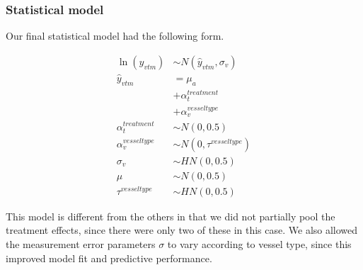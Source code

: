 \documentclass[
  letterpaper,
  DIV=11,
  numbers=noendperiod,
  oneside]{scrartcl}
\theoremstyle{plain}
\theoremstyle{remark}
\begin{document}
\begin{figure}


\caption{\label{fig-hypertension-data}}

\end{figure}%

\subsubsection{Statistical model}\label{statistical-model}

Our final statistical model had the following form.

\begin{align}
\ln(y_{vtm}) &\sim N(\hat{y}_{vtm}, \sigma_v) \label{eq-hypertension-model} \\
\hat{y}_{vtm} &= \mu_a \nonumber \\
  &+ \alpha^{treatment}_{t} \nonumber \\
  &+ \alpha^{vesseltype}_{v} \nonumber \\
\alpha^{treatment}_t &\sim N(0, 0.5) \nonumber \\
\alpha^{vesseltype}_v &\sim N(0, \tau^{vesseltype}) \nonumber \\
\sigma_v &\sim HN(0, 0.5) \nonumber \\
\mu &\sim N(0, 0.5) \nonumber \\
\tau^{vesseltype} &\sim HN(0, 0.5) \nonumber
\end{align}

This model is different from the others in that we did not partially
pool the treatment effects, since there were only two of these in this
case. We also allowed the measurement error parameters \(\sigma\) to
vary according to vessel type, since this improved model fit and
predictive performance.
\end{document}
